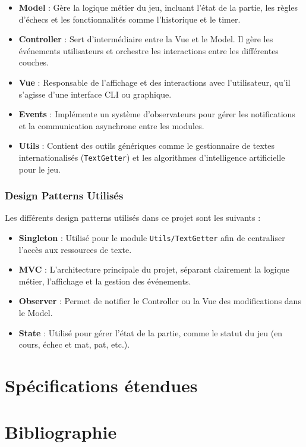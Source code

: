 \documentclass{article}
\begin{document}
\begin{itemize}
    \item \textbf{Model} : Gère la logique métier du jeu, incluant l'état de la partie, les règles d'échecs et les fonctionnalités comme l'historique et le timer.
    \item \textbf{Controller} : Sert d'intermédiaire entre la Vue et le Model. Il gère les événements utilisateurs et orchestre les interactions entre les différentes couches.
    \item \textbf{Vue} : Responsable de l'affichage et des interactions avec l'utilisateur, qu'il s'agisse d'une interface CLI ou graphique.
    \item \textbf{Events} : Implémente un système d'observateurs pour gérer les notifications et la communication asynchrone entre les modules.
    \item \textbf{Utils} : Contient des outils génériques comme le gestionnaire de textes internationalisés (\texttt{TextGetter}) et les algorithmes d'intelligence artificielle pour le jeu.
\end{itemize}

\subsubsection{Design Patterns Utilisés}

Les différents design patterns utilisés dans ce projet sont les suivants : 
\begin{itemize}
    \item \textbf{Singleton} : Utilisé pour le module \texttt{Utils/TextGetter} afin de centraliser l'accès aux ressources de texte.
    \item \textbf{MVC} : L'architecture principale du projet, séparant clairement la logique métier, l'affichage et la gestion des événements.
    \item \textbf{Observer} : Permet de notifier le Controller ou la Vue des modifications dans le Model.
    \item \textbf{State} : Utilisé pour gérer l'état de la partie, comme le statut du jeu (en cours, échec et mat, pat, etc.).
\end{itemize}


\section{Spécifications étendues}

\section{Bibliographie}


\end{document}
